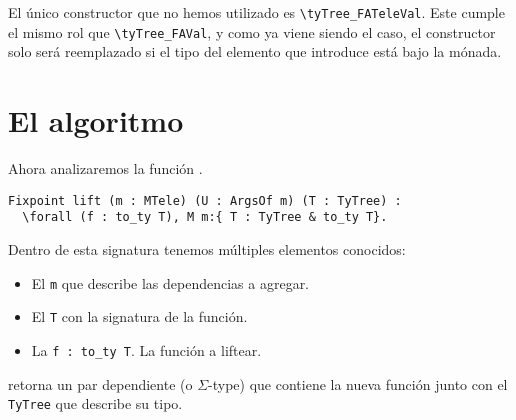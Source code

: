 El único constructor que no hemos utilizado es \lstinline{\tyTree_FATeleVal}.
Este cumple el mismo rol que \lstinline{\tyTree_FAVal}, y como ya viene siendo el caso, el constructor solo será reemplazado si el tipo del elemento que introduce está bajo la mónada.

\iffalse
Tomemos una función de ejemplo con la siguiente signatura.

\begin{lstlisting}
\forall (T : Type) (R : T -> Type) (t : T), M (R t)
$\equiv$
\tyTree_FAType \; (fun T => \tyTree_FAType \; (fun R : T -> Type => \tyTree_FAVal \; T (fun t => \tyTree_M \; (R t))))
\end{lstlisting}

La traducción será muy directa.

\begin{lstlisting}
\tyTree_FAType \; (fun T => \tyTree_FATeleType \; (fun R : T -> Type => \tyTree_FATeleVal \; T (fun t => \tyTree_M \; (R t))))
\end{lstlisting}

Notar que el primer constructor no es reemplazado ya que \lstinline{T} no se encuentra bajo la mónada en ningún momento.
\fi

\section{El algoritmo}

Ahora analizaremos la función \lift.

\begin{lstlisting}[frame=tb,caption={Signatura de \lift},label=lst:tipo_lift]
Fixpoint lift (m : MTele) (U : ArgsOf m) (T : TyTree) :
  \forall (f : to_ty T), M m:{ T : TyTree & to_ty T}.
\end{lstlisting}

Dentro de esta signatura tenemos múltiples elementos conocidos:
\begin{itemize}
  \item El  \lstinline{m} que describe las dependencias a agregar.
  \item El  \lstinline{T} con la signatura de la función.
  \item La  \lstinline{f : to_ty T}. La función a liftear.
\end{itemize}

\lift retorna un par dependiente (o $\Sigma$-type) que contiene la nueva función junto con el \lstinline{TyTree} que describe su tipo.


